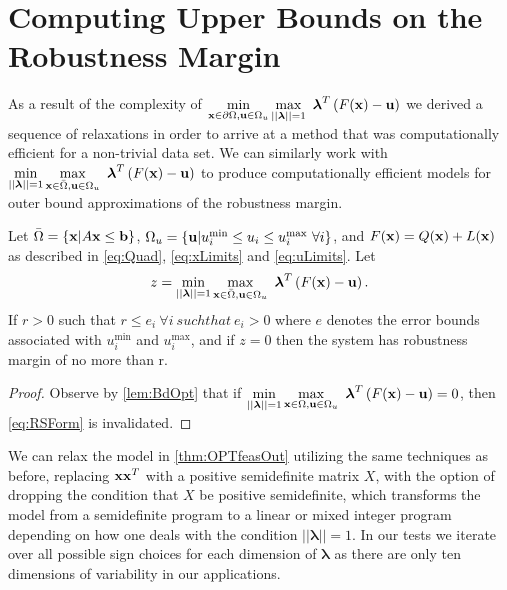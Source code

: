\section{Computing Upper Bounds on the Robustness Margin} \label{sec:outbdform}  

As a result of the complexity of $\displaystyle \min\limits_{\vx\in \partial \Omega, \vu\in\Omega_u}\max\limits_{||\boldsymbol{\lambda}||=1 }\ \boldsymbol{\lambda}^T\left(F(\vx)-\vu\right)$ we derived a sequence of relaxations in order to arrive at a method that was computationally efficient for a non-trivial data set. 
We can similarly work with $\displaystyle \min\limits_{||\boldsymbol{\lambda}||=1}\max\limits_{\vx\in \bar{\Omega}, \vu\in\Omega_u}\ \boldsymbol{\lambda}^T\left(F(\vx)-\vu\right)$ to produce computationally efficient models for outer bound approximations of the robustness margin. 
\begin{thm}\label{thm:OPTfeasOut} 
Let $\bar{\Omega}=\{\mathbf{x}| A\mathbf{x}\leq \mathbf{b}\}$, $\Omega_{u}=\{\mathbf{u}| u^{\min}_i\leq u_i \leq u^{\max}_i \ \forall i \}$, and $F(\mathbf{x})=Q(\mathbf{x})+L(\mathbf{x})$ as described in \cref{eq:Quad}, \cref{eq:xLimits} and \cref{eq:uLimits}. 
Let
$$z = \min\limits_{||\boldsymbol{\lambda}||=1}\max\limits_{\vx\in \bar{\Omega}, \vu\in\Omega_u}\ \boldsymbol{\lambda}^T\left(F(\vx)-\vu\right).$$
If $r>0$ such that $r\leq e_i \ \forall i \ such that \ e_i>0$ where $e$ denotes the error bounds associated with $ u^{\min}_i$ and $ u^{\max}_i$, and if $z=0$ then the system has robustness margin of no more than r.

\begin{proof} 
  Observe by \cref{lem:BdOpt} that if $\min\limits_{||\boldsymbol{\lambda}||=1}\max\limits_{\vx\in \Omega, \vu\in\Omega_u}\ \boldsymbol{\lambda}^T\left(F(\vx)-\vu\right)=0$, then \cref{eq:RSForm} is invalidated.  

\end{proof}
\end{thm}

We can relax the model in \cref{thm:OPTfeasOut} utilizing the same techniques as before, replacing $\mathbf{x}\mathbf{x}^T$ with a positive semidefinite matrix $X$, with the option of dropping the condition that $X$ be positive semidefinite, which transforms the model from a semidefinite program to a linear or mixed integer program depending on how one deals with the condition $||\boldsymbol{\lambda}||=1$. 
In our tests we iterate over all possible sign choices for each dimension of $\boldsymbol{\lambda}$ as there are only ten dimensions of variability in our applications. \\

